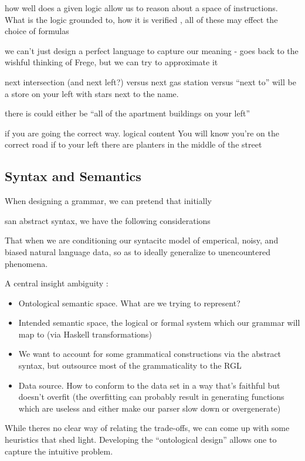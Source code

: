 \documentclass[a4paper, 11pt]{article}
\begin{document}
how well does a given logic allow us to reason about a space of instructions.
What is the logic grounded to, how it is verified , all of these may effect the
choice of formulas

we can't just design a perfect language to capture our meaning - goes back to
the wishful thinking of Frege, but we can try to approximate it

next intersection (and next left?) versus next gas station versus ``next to''
 will be a store on your left with stars next to the name.

there is could either be 
``all of the apartment buildings on your left''

if you are going the correct way.
logical content
You will know you're on the correct road if to your left there are planters in the middle of the street


\subsection{Syntax and Semantics}

When designing a grammar, we can pretend that initially

san abstract syntax, we have the following considerations

That when we are conditioning our syntacitc model of emperical, noisy, and
biased natural language data, so as to ideally generalize to unencountered
phenomena.

A central insight ambiguity : 


\begin{itemize}
\item Ontological semantic space. What are we trying to represent?
\item Intended semantic space, the logical or formal system which our grammar
  will map to (via Haskell transformations)
\item  We want to account for some grammatical constructions via the abstract syntax, but
  outsource most of the grammaticality to the RGL
\item Data source. How to conform to the data set in a way that's faithful but
  doesn't overfit (the overfitting can probably result in generating functions
  which are useless and either make our parser slow down or overgenerate)
\end{itemize}

While theres no clear way of relating the trade-offs, we can come up with some
heuristics that shed light. Developing the ``ontological design'' allows one to
capture the intuitive problem.
\end{document}
